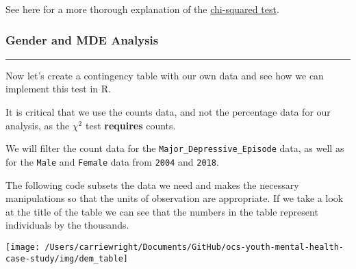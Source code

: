 \documentclass[
]{article}
\newenvironment{Shaded}{\begin{snugshade}}{\end{snugshade}}
\newcommand{\CommentTok}[1]{\textcolor[rgb]{0.56,0.35,0.01}{\textit{#1}}}
\newcommand{\DataTypeTok}[1]{\textcolor[rgb]{0.13,0.29,0.53}{#1}}
\newcommand{\DecValTok}[1]{\textcolor[rgb]{0.00,0.00,0.81}{#1}}
\newcommand{\FloatTok}[1]{\textcolor[rgb]{0.00,0.00,0.81}{#1}}
\newcommand{\KeywordTok}[1]{\textcolor[rgb]{0.13,0.29,0.53}{\textbf{#1}}}
\newcommand{\NormalTok}[1]{#1}
\newcommand{\OperatorTok}[1]{\textcolor[rgb]{0.81,0.36,0.00}{\textbf{#1}}}
\newcommand{\StringTok}[1]{\textcolor[rgb]{0.31,0.60,0.02}{#1}}
\begin{document}
See here for a more thorough explanation of the
\href{https://www.ling.upenn.edu/~clight/chisquared.htm}{chi-squared
test}.

\hypertarget{gender-and-mde-analysis}{%
\subsubsection{\texorpdfstring{\textbf{Gender and MDE
Analysis}}{Gender and MDE Analysis}}\label{gender-and-mde-analysis}}

\begin{center}\rule{0.5\linewidth}{0.5pt}\end{center}

Now let's create a contingency table with our own data and see how we
can implement this test in R.

It is critical that we use the counts data, and not the percentage data
for our analysis, as the \({\chi}^2\) test \textbf{requires} counts.

We will filter the count data for the
\texttt{Major\_Depressive\_Episode} data, as well as for the
\texttt{Male} and \texttt{Female} data from \texttt{2004} and
\texttt{2018}.

The following code subsets the data we need and makes the necessary
manipulations so that the units of observation are appropriate. If we
take a look at the title of the table we can see that the numbers in the
table represent individuals by the thousands.

\begin{center}\texttt{[image: /Users/carriewright/Documents/GitHub/ocs-youth-mental-health-case-study/img/dem\_table]} \end{center}

\begin{Shaded}
\end{Shaded}
\end{document}
